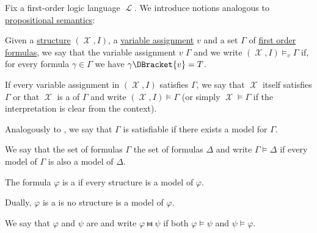 \begin{definition}\label{def:first_order_semantics}
  Fix a first-order logic language \( \mscrL \). We introduce notions analogous to \hyperref[def:propositional_semantics]{propositional semantics}:
  \begin{DefEnum}
     Given a \hyperref[def:first_order_structure]{structure} \( (\mscrX, I) \), a \hyperref[def:first_order_valuation/variable_assignment]{variable assignment} \( v \) and a set \( \Gamma \) of \hyperref[def:first_order_syntax/formula]{first order formulas}, we say that the variable assignment \( v \)  \( \Gamma \) and we write \( (\mscrX, I) \vDash_v \Gamma \) if, for every formula \( \gamma \in \Gamma \) we have \( \gamma\DBracket{v} = T \).

    If every variable assignment in \( (\mscrX, I) \) satisfies \( \Gamma \), we say that \( \mscrX \) itself satisfies \( \Gamma \) or that \( \mscrX \) is a  of \( \Gamma \) and write \( (\mscrX, I) \vDash \Gamma \) (or simply \( \mscrX \vDash \Gamma \) if the interpretation is clear from the context).

    Analogously to , we say that \( \Gamma \) is satisfiable if there exists a model for \( \Gamma \).

     We say that the set of formulas \( \Gamma \)  the set of formulas \( \Delta \) and write \( \Gamma \vDash \Delta \) if every model of \( \Gamma \) is also a model of \( \Delta \).

     The formula \( \varphi \) is a  if every structure is a model of \( \varphi \).

     Dually, \( \varphi \) is a  is no structure is a model of \( \varphi \).

     We say that \( \varphi \) and \( \psi \) are  and write \( \varphi \gleichstark \psi \) if both \( \varphi \vDash \psi \) and \( \psi \vDash \varphi \).
  \end{DefEnum}
\end{definition}


